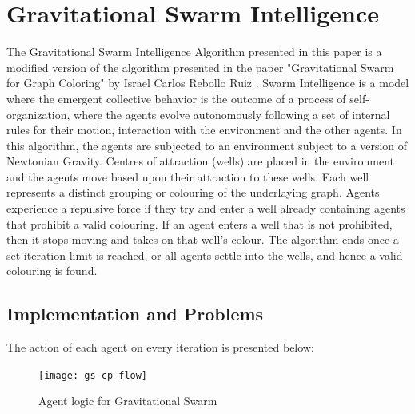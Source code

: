 \section{Gravitational Swarm Intelligence}
The Gravitational Swarm Intelligence Algorithm presented in this paper is a modified version of the algorithm presented in the paper "Gravitational Swarm for Graph Coloring" by Israel Carlos Rebollo Ruiz \cite{bib:GravSwarm}. Swarm Intelligence is a model where the emergent collective behavior is the outcome of a process of self-organization, where the agents evolve autonomously following a set of internal rules for their motion, interaction with the environment and the other agents. In this algorithm, the agents are subjected to an environment subject to a version of Newtonian Gravity. Centres of attraction (wells) are placed in the environment and the agents move based upon their attraction to these wells. Each well represents a distinct grouping or colouring of the underlaying graph. Agents experience a repulsive force if they try and enter a well already containing agents that prohibit a valid colouring. If an agent enters a well that is not prohibited, then it stops moving and takes on that well's colour. The algorithm ends once a set iteration limit is reached, or all agents settle into the wells, and hence a valid colouring is found.

\subsection{Implementation and Problems}
The action of each agent on every iteration is presented below:

\begin{figure}[H]
\caption{Agent logic for Gravitational Swarm}
\centering
\texttt{[image: gs-cp-flow]}
\end{figure}


